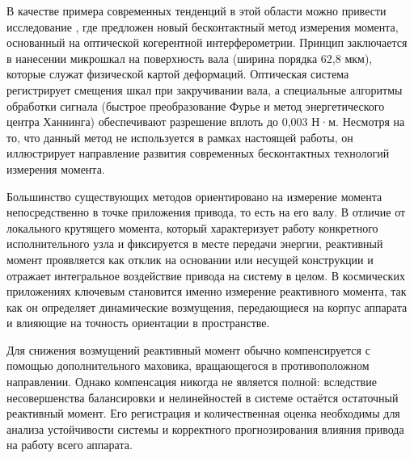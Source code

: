 В качестве примера современных тенденций в этой области можно привести исследование \cite{Chen2024}, где предложен новый бесконтактный метод измерения момента, основанный на оптической когерентной интерферометрии. Принцип заключается в нанесении микрошкал на поверхность вала (ширина порядка 62,8 мкм), которые служат физической картой деформаций. Оптическая система регистрирует смещения шкал при закручивании вала, а специальные алгоритмы обработки сигнала (быстрое преобразование Фурье и метод энергетического центра Ханнинга) обеспечивают разрешение вплоть до 0,003 Н·м. Несмотря на то, что данный метод не используется в рамках настоящей работы, он иллюстрирует направление развития современных бесконтактных технологий измерения момента.

Большинство существующих методов ориентировано на измерение момента непосредственно в точке приложения привода, то есть на его валу. В отличие от локального крутящего момента, который характеризует работу конкретного исполнительного узла и фиксируется в месте передачи энергии, реактивный момент проявляется как отклик на основании или несущей конструкции и отражает интегральное воздействие привода на систему в целом. В космических приложениях ключевым становится именно измерение реактивного момента, так как он определяет динамические возмущения, передающиеся на корпус аппарата и влияющие на точность ориентации в пространстве.

Для снижения возмущений реактивный момент обычно компенсируется с помощью дополнительного маховика, вращающегося в противоположном направлении. Однако компенсация никогда не является полной: вследствие несовершенства балансировки и нелинейностей в системе остаётся остаточный реактивный момент. Его регистрация и количественная оценка необходимы для анализа устойчивости системы и корректного прогнозирования влияния привода на работу всего аппарата.

